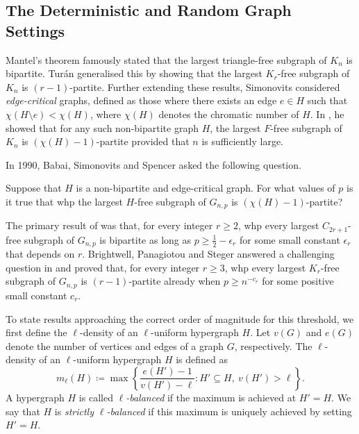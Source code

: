 \documentclass[11pt,a4paper,oneside,reqno]{amsart}
\newcommand{\1}{\mathbbm{1}} %
\renewcommand{\ge}{\geqslant}
\begin{document}
\subsection*{The Deterministic and Random Graph Settings}
Mantel's theorem \cite{mantel1907} famously stated that the largest triangle-free subgraph of $K_n$ is bipartite. Tur\'an \cite{Tur41} generalised this by showing that the largest $K_r$-free subgraph of $K_n$ is $(r-1)$-partite. 
Further extending these results, Simonovits considered \textit{edge-critical} graphs, defined as those where there exists an edge $e \in H$ such that $\chi(H \setminus e) < \chi(H)$, where $\chi(H)$ denotes the chromatic number of $H$. In \cite{Sim68}, he showed that for any such non-bipartite graph $H$, the largest $F$-free subgraph of $K_n$ is $(\chi(H)-1)$-partite provided that $n$ is sufficiently large.

In 1990, Babai, Simonovits and Spencer \cite{BabSimSpe90} asked the following question.
\begin{quest}
    Suppose that $H$ is a non-bipartite and edge-critical graph. For what values of $p$ is it true that whp the largest $H$-free subgraph of $G_{n, p}$ is $(\chi(H)-1)$-partite?
\end{quest}

The primary result of \cite{BabSimSpe90} was that, for every integer $r \ge 2$, whp every largest $C_{2r + 1}$-free subgraph of $G_{n, p}$ is bipartite as long as $p \ge \frac{1}{2} - \epsilon_r$ for some small constant $\epsilon_r$ that depends on $r$. Brightwell, Panagiotou and Steger \cite{BriPanSte12} answered a challenging question in \cite{BabSimSpe90} and proved that, for every integer $r \ge 3$, whp every largest $K_r$-free subgraph of $G_{n, p}$ is $(r-1)$-partite already when $p \ge n^{-{c_r}}$ for some positive small constant $c_r$. 

To state results approaching the correct order of magnitude for this threshold, we first define the $\ell$-density of an $\ell$-uniform hypergraph $H$. Let $v(G)$ and $e(G)$ denote the number of vertices and edges of a graph $G$, respectively. The $\ell$-density of an $\ell$-uniform hypergraph $H$ is defined as
\[
    m_\ell(H) \coloneqq \max\left\{\frac{e(H') - 1}{v(H') - \ell} \colon H' \subseteq H,\ v(H') > \ell\right\}.
\]
A hypergraph $H$ is called \textit{$\ell$-balanced} if the maximum is achieved at $H'=H$. We say that $H$ is \textit{strictly $\ell$-balanced} if this maximum is uniquely achieved by setting $H'=H$.
\end{document}

